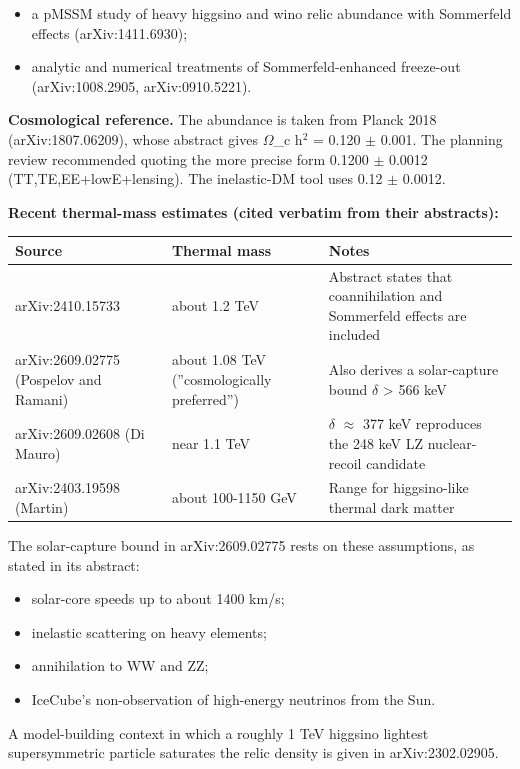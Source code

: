 \documentclass[11pt,a4paper]{article}
\begin{document}
\begin{itemize}
  \item a pMSSM study of heavy higgsino and wino relic abundance with Sommerfeld effects (arXiv:1411.6930);
  \item analytic and numerical treatments of Sommerfeld-enhanced freeze-out (arXiv:1008.2905, arXiv:0910.5221).
\end{itemize}
\textbf{Cosmological reference.} The abundance is taken from Planck 2018 (arXiv:1807.06209), whose abstract gives $\Omega$\_c h$^2$ = 0.120 $\pm$ 0.001. The planning review recommended quoting the more precise form 0.1200 $\pm$ 0.0012 (TT,TE,EE+lowE+lensing). The inelastic-DM tool uses 0.12 $\pm$ 0.0012.

\textbf{Recent thermal-mass estimates (cited verbatim from their abstracts):}

\begin{longtable}{@{}p{}p{}p{}@{}}
\toprule
\textbf{Source} & \textbf{Thermal mass} & \textbf{Notes} \\ \midrule \endhead
arXiv:2410.15733 & about 1.2 TeV & Abstract states that coannihilation and Sommerfeld effects are included \\
arXiv:2609.02775 (Pospelov and Ramani) & about 1.08 TeV (''cosmologically preferred'') & Also derives a solar-capture bound $\delta$ \textgreater{} 566 keV \\
arXiv:2609.02608 (Di Mauro) & near 1.1 TeV & $\delta$ $\approx$ 377 keV reproduces the 248 keV LZ nuclear-recoil candidate \\
arXiv:2403.19598 (Martin) & about 100-1150 GeV & Range for higgsino-like thermal dark matter \\
\bottomrule\end{longtable}
The solar-capture bound in arXiv:2609.02775 rests on these assumptions, as stated in its abstract:

\begin{itemize}
  \item solar-core speeds up to about 1400 km/s;
  \item inelastic scattering on heavy elements;
  \item annihilation to WW and ZZ;
  \item IceCube's non-observation of high-energy neutrinos from the Sun.
\end{itemize}
A model-building context in which a roughly 1 TeV higgsino lightest supersymmetric particle saturates the relic density is given in arXiv:2302.02905.
\end{document}
